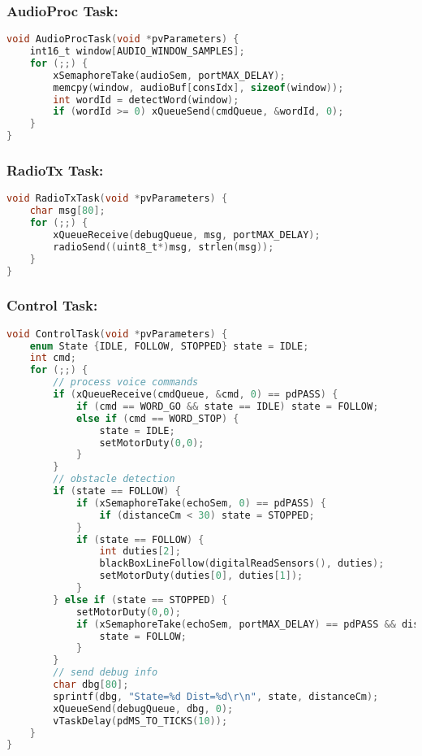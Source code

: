 \vspace*{-1em}
\subsubsection*{AudioProc Task:}
\vspace*{-0.5em}
\begin{lstlisting}[language=C]
void AudioProcTask(void *pvParameters) {
    int16_t window[AUDIO_WINDOW_SAMPLES];
    for (;;) {
        xSemaphoreTake(audioSem, portMAX_DELAY);
        memcpy(window, audioBuf[consIdx], sizeof(window));
        int wordId = detectWord(window);
        if (wordId >= 0) xQueueSend(cmdQueue, &wordId, 0);
    }
}
\end{lstlisting}

\vspace*{-1em}
\subsubsection*{RadioTx Task:}
\vspace*{-0.5em}
\begin{lstlisting}[language=C]
void RadioTxTask(void *pvParameters) {
    char msg[80];
    for (;;) {
        xQueueReceive(debugQueue, msg, portMAX_DELAY);
        radioSend((uint8_t*)msg, strlen(msg));
    }
}
\end{lstlisting}

\newpage
\subsubsection*{Control Task:}
\vspace*{-0.5em}
\begin{lstlisting}[language=C]
void ControlTask(void *pvParameters) {
    enum State {IDLE, FOLLOW, STOPPED} state = IDLE;
    int cmd;
    for (;;) {
        // process voice commands
        if (xQueueReceive(cmdQueue, &cmd, 0) == pdPASS) {
            if (cmd == WORD_GO && state == IDLE) state = FOLLOW;
            else if (cmd == WORD_STOP) {
                state = IDLE;
                setMotorDuty(0,0);
            }
        }
        // obstacle detection
        if (state == FOLLOW) {
            if (xSemaphoreTake(echoSem, 0) == pdPASS) {
                if (distanceCm < 30) state = STOPPED;
            }
            if (state == FOLLOW) {
                int duties[2];
                blackBoxLineFollow(digitalReadSensors(), duties);
                setMotorDuty(duties[0], duties[1]);
            }
        } else if (state == STOPPED) {
            setMotorDuty(0,0);
            if (xSemaphoreTake(echoSem, portMAX_DELAY) == pdPASS && distanceCm >= 30) {
                state = FOLLOW;
            }
        }
        // send debug info
        char dbg[80];
        sprintf(dbg, "State=%d Dist=%d\r\n", state, distanceCm);
        xQueueSend(debugQueue, dbg, 0);
        vTaskDelay(pdMS_TO_TICKS(10));
    }
}
\end{lstlisting}
